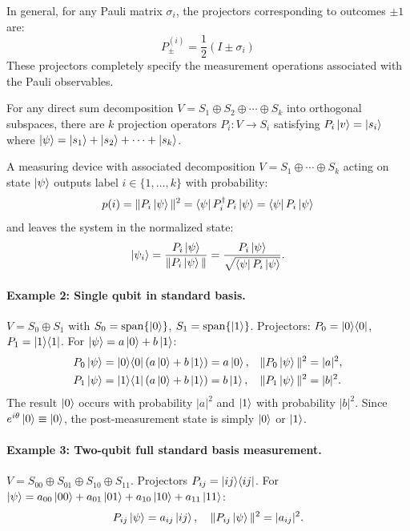 \documentclass[10pt,a4paper]{article}
\begin{document}
In general, for any Pauli matrix $\sigma_i$, the projectors corresponding to outcomes $\pm 1$ are:
\begin{equation}
    P_{\pm}^{(i)} = \frac{1}{2}(I \pm \sigma_i)
\end{equation}
These projectors completely specify the measurement operations associated with the Pauli observables.

For any direct sum decomposition $V=S_1\oplus S_2\oplus\cdots\oplus S_k$ into orthogonal subspaces, there are $k$ projection operators $P_i:V\to S_i$ satisfying $P_i\ket{v}=\ket{s_i}$ where $\ket{\psi}=\ket{s_1}+\ket{s_2}+\cdots+\ket{s_k}$.

\begin{tcolorbox}[propstyle, title={Measurement Postulate (Complete Projective Form)}]
A measuring device with associated decomposition $V=S_1\oplus\cdots\oplus S_k$ acting on state $\ket{\psi}$ outputs label $i\in\{1,\dots,k\}$ with probability:
\[
p(i) = \|P_i\ket{\psi}\|^2 = \bra{\psi}P_i^\dagger P_i\ket{\psi} = \bra{\psi}P_i\ket{\psi}
\]
and leaves the system in the normalized state:
\[
\ket{\psi_i} = \frac{P_i\ket{\psi}}{\|P_i\ket{\psi}\|} = \frac{P_i\ket{\psi}}{\sqrt{\bra{\psi}P_i\ket{\psi}}}.
\]
\end{tcolorbox}

\paragraph{Example 2: Single qubit in standard basis.}
$V=S_0\oplus S_1$ with $S_0=\mathrm{span}\{\ket{0}\}$, $S_1=\mathrm{span}\{\ket{1}\}$. Projectors: $P_0=\ket{0}\!\bra{0}$, $P_1=\ket{1}\!\bra{1}$. For $\ket{\psi}=a\ket{0}+b\ket{1}$:
\begin{align*}
P_0\ket{\psi} &= \ket{0}\!\bra{0}(a\ket{0}+b\ket{1}) = a\ket{0}, & \|P_0\ket{\psi}\|^2 &= |a|^2,\\
P_1\ket{\psi} &= \ket{1}\!\bra{1}(a\ket{0}+b\ket{1}) = b\ket{1}, & \|P_1\ket{\psi}\|^2 &= |b|^2.
\end{align*}
The result $\ket{0}$ occurs with probability $|a|^2$ and $\ket{1}$ with probability $|b|^2$. Since $e^{i\theta}\ket{0}\equiv\ket{0}$, the post-measurement state is simply $\ket{0}$ or $\ket{1}$.

\paragraph{Example 3: Two-qubit full standard basis measurement.}
$V=S_{00}\oplus S_{01}\oplus S_{10}\oplus S_{11}$. Projectors $P_{ij}=\ket{ij}\!\bra{ij}$. For $\ket{\psi}=a_{00}\ket{00}+a_{01}\ket{01}+a_{10}\ket{10}+a_{11}\ket{11}$:
\[
P_{ij}\ket{\psi}=a_{ij}\ket{ij},\quad \|P_{ij}\ket{\psi}\|^2=|a_{ij}|^2.
\]
\end{document}
